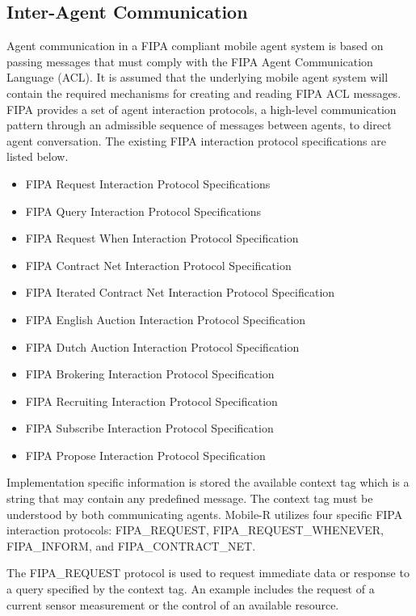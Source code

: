   \subsection{Inter-Agent Communication} \label{sec:fipa}
    Agent communication in a FIPA compliant mobile agent system is based on 
      passing messages that must comply with the FIPA Agent Communication 
      Language (ACL).
    It is assumed that the underlying mobile agent system will contain the
      required mechanisms for creating and reading FIPA ACL messages.
    FIPA provides a set of agent interaction protocols, a high-level 
      communication pattern through an admissible sequence of messages between 
      agents, to direct agent conversation.
    The existing FIPA interaction protocol specifications are listed below.
    \begin{itemize}
    \item FIPA Request Interaction Protocol Specifications
    \item FIPA Query Interaction Protocol Specifications
    \item FIPA Request When Interaction Protocol Specification
    \item FIPA Contract Net Interaction Protocol Specification
    \item FIPA Iterated Contract Net Interaction Protocol Specification
    \item FIPA English Auction Interaction Protocol Specification
    \item FIPA Dutch Auction Interaction Protocol Specification
    \item FIPA Brokering Interaction Protocol Specification
    \item FIPA Recruiting Interaction Protocol Specification
    \item FIPA Subscribe Interaction Protocol Specification
    \item FIPA Propose Interaction Protocol Specification
    \end{itemize}
    Implementation specific information is stored the available context 
      tag which is a string that may contain any predefined message. 
    The context tag must be understood by both communicating agents.
    Mobile-R utilizes four specific FIPA interaction protocols: 
      FIPA\_REQUEST, FIPA\_REQUEST\_WHENEVER, FIPA\_INFORM, and 
      FIPA\_CONTRACT\_NET.

    The FIPA\_REQUEST protocol is used to request immediate data or response to 
      a query specified by the context tag. 
    An example includes the request of a current sensor measurement or the 
      control of an available resource.

